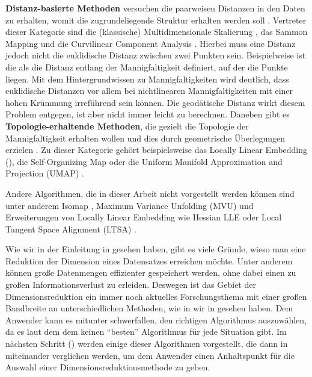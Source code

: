 \textbf{Distanz-basierte Methoden} versuchen die paarweisen Distanzen in den Daten zu erhalten, womit die zugrundeliegende Struktur erhalten werden soll \parencite[3]{Gracia.2014}. Vertreter dieser Kategorie sind die (klassische) Multidimensionale
Skalierung \parencites{Kruskal.1964}{Cox.2008}, das Sammon Mapping \addref und die Curvilinear Component Analysis
\addref. Hierbei muss eine Distanz jedoch nicht die euklidische Distanz zwischen zwei Punkten sein.
Beispielweise ist die  als die Distanz entlang der Mannigfaltigkeit
definiert, auf der die Punkte liegen. Mit dem Hintergrundwissen zu Mannigfaltigkeiten wird
deutlich, dass euklidische Distanzen vor allem bei nichtlinearen Mannigfaltigkeiten mit einer hohen
Krümmung irreführend sein können. Die geodätische Distanz wirkt diesem Problem entgegen, ist aber
nicht immer leicht zu berechnen. Daneben gibt es \textbf{Topologie-erhaltende Methoden}, die
gezielt die Topologie der Mannigfaltigkeit erhalten wollen und dies durch geometrische Überlegungen
erzielen \parencite[4]{Gracia.2014}. Zu dieser Kategorie gehört beispielsweise das Locally Linear Embedding
(), die Self-Organizing Map \parencite{Kohonen.1990} oder die Uniform Manifold Approximation and Projection (UMAP) \parencite{McInnes.2018}.

Andere Algorithmen, die in dieser Arbeit nicht vorgestellt werden können sind unter anderem Isomap \parencite{Tenenbaum.2000}, Maximum Variance Unfolding (MVU) \parencite{Weinberger.2006} und Erweiterungen von Locally Linear Embedding wie Hessian LLE \parencite{Donoho.2003} oder Local Tangent Space Alignment (LTSA) \parencite{Zhang.2002}.

Wie wir in der Einleitung in  gesehen haben, gibt es viele Gründe, wieso man
eine Reduktion der Dimension eines Datensatzes erreichen möchte. Unter anderem können große
Datenmengen effizienter gespeichert werden, ohne dabei einen zu großen Informationsverlust zu
erleiden. Deswegen ist das Gebiet der Dimensionsreduktion ein immer noch aktuelles Forschungsthema
mit einer großen Bandbreite an unterschiedlichen Methoden, wie in wir in
 gesehen haben. Dem Anwender kann es mitunter schwerfallen,
den richtigen Algorithmus auszuwählen, da es laut dem dem  \parencite{Wolpert.1997} keinen \enquote{besten} Algorithmus für jede Situation gibt. Im nächsten
Schritt () werden einige dieser Algorithmen vorgestellt, die dann in
 miteinander verglichen werden, um dem Anwender einen Anhaltspunkt für die
Auswahl einer Dimensionsreduktionsmethode zu geben.
